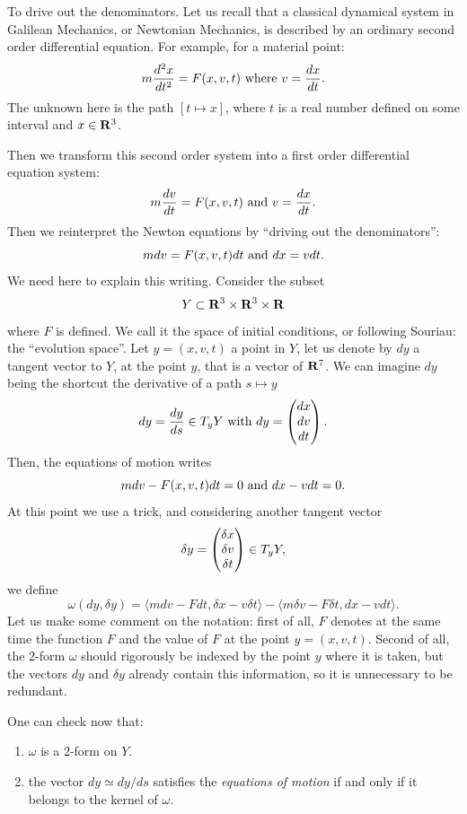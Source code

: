 \begin{Article}{To drive out the denominators.}{}
  Let us recall that a classical dynamical system in Galilean Mechanics,
  or Newtonian Mechanics,
  is described by an ordinary second order differential equation.
  For example,
  for a material point:
  $$%
    m{d^2x \over dt^2}
    = F(x,v,t)
    \SpacedText{where} v = {dx \over dt}.
    $$%
  The unknown here is the path $[t \mapsto x]$,
  where $t$ is a real number defined on some interval and $x \in \mathbf{R}^3$.
  
  Then we transform this second order system into a first order differential equation system:
  $$%
    m{dv \over dt}
    = F(x,v,t)
    \SpacedText{and}
    v = {dx \over dt}.
    $$%
  Then we reinterpret the Newton equations by ``driving out the denominators'':
  $$%
    m dv = F(x,v,t) dt
    \SpacedText{and}
    dx = v dt.
    $$%
  We need here to explain this writing.
  Consider the subset
  $$%
    Y \subset \RR^3 \times \RR^3 \times \RR
    $$%
  where $F$ is defined.
  We call it the space of initial conditions,
  or following Souriau:
  the ``evolution space''.
  Let $y= (x,v,t)$ a point in $Y$,
  let us denote by $dy$ a tangent vector to $Y$, at the point $y$,
  that is a vector of $\mathbf{R}^7$.
  We can imagine $dy$ being the shortcut the derivative of a path $s \mapsto y$
  $$%
    dy = {dy \over ds} \in T_yY
    \SpacedText{with}
    dy = \Vector{dx \\ dv \\ dt}.
    $$%
  Then,
  the equations of motion writes
  $$%
    m dv - F(x,v,t) dt =0
    \SpacedText{and}
    dx -vdt =0.
    $$%
  At this point we use a trick,
  and considering another tangent vector
  $$%
    \delta y = \Vector{\delta x \\ \delta v \\ \delta t} \in T_yY,
    $$%
  we define
  $$%
    \omega(dy,\delta y) = \langle m dv - F dt, \delta x - v \delta t\rangle
    - \langle m \delta v - F \delta t,  dx - v dt\rangle.
    $$%
  Let us make some comment on the notation:
  first of all,
  $F$ denotes at the same time the function $F$ and the value of $F$ at the point $y=(x,v,t)$.
  Second of all,
  the $2$-form $\omega$ should rigorously be indexed by the point $y$ where it is taken,
  but the vectors $dy$ and $\delta y$ already contain this information,
  so it is unnecessary to be redundant.
  
  One can check now that:
  
  \begin{enumerate}
    \item $\omega$ is a $2$-form on $Y$.
    \item the vector $dy \simeq dy/ds$ satisfies the \emph{equations of motion} if and only if it belongs to the kernel of $\omega$.
  \end{enumerate}
  

\end{Article}
